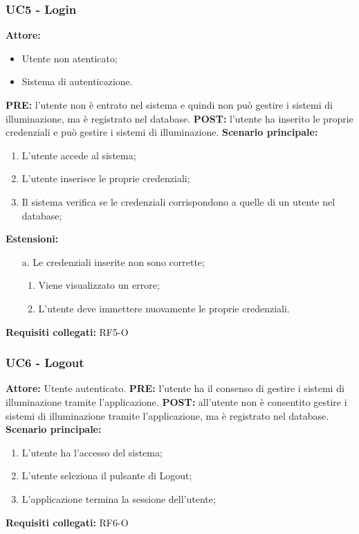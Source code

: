 \documentclass[a4paper, 12pt]{article}
\begin{document}
\subsubsection{UC5 - Login}
\textbf{Attore:} 
\begin{itemize}
    \item Utente non atenticato;
    \item Sistema di autenticazione.
\end{itemize}
\textbf{PRE:} l'utente non è entrato nel sistema e quindi non può gestire i sistemi di illuminazione, ma è registrato nel database.\newline
\textbf{POST:} l'utente ha inserito le proprie credenziali e può gestire i sistemi di illuminazione.\newline
\textbf{Scenario principale:}
\begin{enumerate}
    \item L'utente accede al sistema;
    \item L'utente inserisce le proprie credenziali;
    \item Il sistema verifica se le credenziali corrispondono a quelle di un utente nel database;
\end{enumerate}
\textbf{Estensioni:}
\begin{itemize}
    \item [a.] Le credenziali inserite non sono corrette;
    \begin{enumerate}
        \item Viene visualizzato un errore;
        \item L'utente deve immettere nuovamente le proprie credenziali.
    \end{enumerate}
\end{itemize}
\textbf{Requisiti collegati:} RF5-O\newline

\subsubsection{UC6 - Logout}
\textbf{Attore:} Utente autenticato.\newline
\textbf{PRE:} l'utente ha il consenso di gestire i sistemi di illuminazione tramite l'applicazione.\newline
\textbf{POST:} all'utente non è consentito gestire i sistemi di illuminazione tramite l'applicazione, ma è registrato nel database.\newline
\textbf{Scenario principale:}
\begin{enumerate}
    \item L'utente ha l'accesso del sistema;
    \item L'utente seleziona il pulsante di Logout;
    \item L'applicazione termina la sessione dell'utente;
\end{enumerate}
\textbf{Requisiti collegati:} RF6-O\newline
\end{document}
